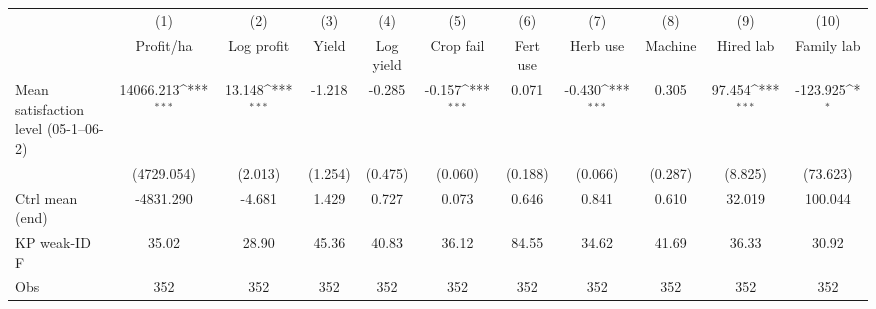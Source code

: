 {
\def\sym#1{\ifmmode^{#1}\else\(^{#1}\)\fi}
\begin{tabular}{l*{10}{c}}
\toprule
                    &\multicolumn{1}{c}{(1)}&\multicolumn{1}{c}{(2)}&\multicolumn{1}{c}{(3)}&\multicolumn{1}{c}{(4)}&\multicolumn{1}{c}{(5)}&\multicolumn{1}{c}{(6)}&\multicolumn{1}{c}{(7)}&\multicolumn{1}{c}{(8)}&\multicolumn{1}{c}{(9)}&\multicolumn{1}{c}{(10)}\\
                    &\multicolumn{1}{c}{Profit/ha}&\multicolumn{1}{c}{Log profit}&\multicolumn{1}{c}{Yield}&\multicolumn{1}{c}{Log yield}&\multicolumn{1}{c}{Crop fail}&\multicolumn{1}{c}{Fert use}&\multicolumn{1}{c}{Herb use}&\multicolumn{1}{c}{Machine}&\multicolumn{1}{c}{Hired lab}&\multicolumn{1}{c}{Family lab}\\
\midrule
Mean satisfaction level (05-1--06-2)&   14066.213\sym{***}&      13.148\sym{***}&      -1.218         &      -0.285         &      -0.157\sym{***}&       0.071         &      -0.430\sym{***}&       0.305         &      97.454\sym{***}&    -123.925\sym{*}  \\
                    &  (4729.054)         &     (2.013)         &     (1.254)         &     (0.475)         &     (0.060)         &     (0.188)         &     (0.066)         &     (0.287)         &     (8.825)         &    (73.623)         \\
\midrule
Ctrl mean (end)     &   -4831.290         &      -4.681         &       1.429         &       0.727         &       0.073         &       0.646         &       0.841         &       0.610         &      32.019         &     100.044         \\
KP weak-ID F        &       35.02         &       28.90         &       45.36         &       40.83         &       36.12         &       84.55         &       34.62         &       41.69         &       36.33         &       30.92         \\
Obs                 &         352         &         352         &         352         &         352         &         352         &         352         &         352         &         352         &         352         &         352         \\
\bottomrule
\end{tabular}
}
